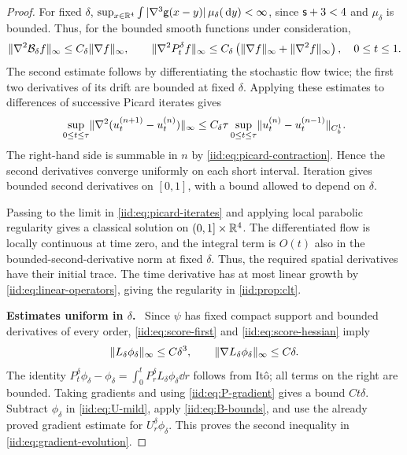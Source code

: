 \documentclass[11pt,reqno]{amsart}
\numberwithin{equation}{section}
\theoremstyle{plain}
\theoremstyle{remark}
\DeclarePairedDelimiter{\norm}{\lVert}{\rVert}
\newcommand{\parheading}[1]{\par\medskip\noindent\textbf{#1}\ }
\begin{document}
\begin{proof}
For fixed $\delta$, $\sup_{x\in\mathbb R^4}\int|\nabla^3\mathsf g(x-y)|\,\mu_\delta(\,\mathrm d y)<\infty$, since $\mathsf{s}+3<4$ and $\mu_\delta$ is bounded. Thus, for the bounded smooth functions under consideration,
\begin{equation}\label{iid:eq:fixed-delta-second-derivatives}
 \norm{\nabla^2\mathcal B_\delta f}_\infty\le C_\delta\norm{\nabla f}_\infty,
 \qquad
 \norm{\nabla^2P_t^\delta f}_\infty
 \le C_\delta\left(\norm{\nabla f}_\infty+\norm{\nabla^2f}_\infty\right),
 \quad 0\le t\le1.
\end{equation}
The second estimate follows by differentiating the stochastic flow twice; the first two derivatives of its drift are bounded at fixed $\delta$. Applying these estimates to differences of successive Picard iterates gives
\begin{equation}\label{iid:eq:picard-second-derivatives}
 \sup_{0\le t\le\tau}\norm{\nabla^2(u^{(n+1)}_t-u^{(n)}_t)}_\infty
 \le C_\delta\tau\sup_{0\le t\le\tau}
       \norm{u^{(n)}_t-u^{(n-1)}_t}_{C_b^1}.
\end{equation}
The right-hand side is summable in $n$ by \eqref{iid:eq:picard-contraction}. Hence the second derivatives converge uniformly on each short interval. Iteration gives bounded second derivatives on $[0,1]$, with a bound allowed to depend on $\delta$.

Passing to the limit in \eqref{iid:eq:picard-iterates} and applying local parabolic regularity \cite[Chapter~5]{Lunardi} gives a classical solution on $(0,1]\times\mathbb R^4$. The differentiated flow is locally continuous at time zero, and the integral term is $O(t)$ also in the bounded-second-derivative norm at fixed $\delta$. Thus, the required spatial derivatives have their initial trace. The time derivative has at most linear growth by \eqref{iid:eq:linear-operators}, giving the regularity in \cref{iid:prop:clt}.

\parheading{Estimates uniform in $\delta$.}
Since $\psi$ has fixed compact support and bounded derivatives of every order, \eqref{iid:eq:score-first} and \eqref{iid:eq:score-hessian} imply
\begin{equation}\label{iid:eq:Lphi}
 \norm{L_\delta\phi_\delta}_\infty\le C\delta^3,
 \qquad
 \norm{\nabla L_\delta\phi_\delta}_\infty\le C\delta.
\end{equation}
The identity $P_t^\delta\phi_\delta-\phi_\delta
=\int_0^tP_r^\delta L_\delta\phi_\delta\dd r$ follows from It\^o; all terms on the right are bounded. Taking gradients and using \eqref{iid:eq:P-gradient} gives a bound $Ct\delta$. Subtract $\phi_\delta$ in \eqref{iid:eq:U-mild}, apply \eqref{iid:eq:B-bounds}, and use the already proved gradient estimate for $U_r^\delta\phi_\delta$. This proves the second inequality in \eqref{iid:eq:gradient-evolution}.


\end{proof}
\end{document}

